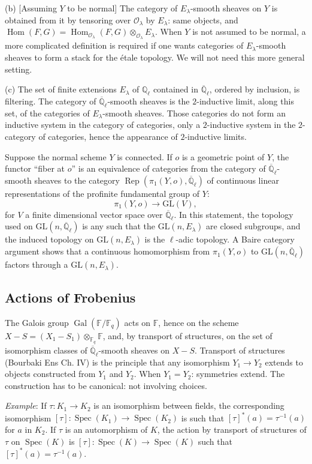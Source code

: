 \documentclass[11pt,a4paper]{article}
\theoremstyle{plain}
\theoremstyle{definition}
\DeclareMathOperator{\Hom}{Hom}
\DeclareMathOperator{\Rep}{Rep}
\DeclareMathOperator{\Spec}{Spec}
\DeclareMathOperator{\Gal}{Gal}
\newcommand{\Ql}{\overline{\mathbb{Q}}_\ell}
\newcommand{\Fq}{\mathbb{F}_q}
\newcommand{\F}{\mathbb{F}}
\newcommand{\Q}{\mathbb{Q}}
\newcommand{\GL}{\mathrm{GL}}
\begin{document}
(b) [Assuming $Y$ to be normal] The category of $E_\lambda$-smooth sheaves on $Y$ is obtained from it by tensoring over $\mathcal{O}_\lambda$ by $E_\lambda$: same objects, and $\Hom(F,G) = \Hom_{\mathcal{O}_\lambda}(F,G) \otimes_{\mathcal{O}_\lambda} E_\lambda$. When $Y$ is not assumed to be normal, a more complicated definition is required if one wants categories of $E_\lambda$-smooth sheaves to form a stack for the \'etale topology. We will not need this more general setting.

(c) The set of finite extensions $E_\lambda$ of $\Q_\ell$ contained in $\Ql$, ordered by inclusion, is filtering. The category of $\Ql$-smooth sheaves is the $2$-inductive limit, along this set, of the categories of $E_\lambda$-smooth sheaves. Those categories do not form an inductive system in the category of categories, only a $2$-inductive system in the $2$-category of categories, hence the appearance of $2$-inductive limits.

Suppose the normal scheme $Y$ is connected. If $o$ is a geometric point of $Y$, the functor ``fiber at $o$'' is an equivalence of categories from the category of $\Ql$-smooth sheaves to the category $\Rep(\pi_1(Y,o), \Ql)$ of continuous linear representations of the profinite fundamental group of $Y$:
\[
\pi_1(Y,o) \to \GL(V),
\]
for $V$ a finite dimensional vector space over $\Ql$. In this statement, the topology used on $\GL(n, \Ql)$ is any such that the $\GL(n, E_\lambda)$ are closed subgroups, and the induced topology on $\GL(n, E_\lambda)$ is the $\ell$-adic topology. A Baire category argument shows that a continuous homomorphism from $\pi_1(Y,o)$ to $\GL(n, \Ql)$ factors through a $\GL(n, E_\lambda)$.

\subsection{Actions of Frobenius}

The Galois group $\Gal(\F/\Fq)$ acts on $\F$, hence on the scheme $X - S = (X_1 - S_1) \otimes_{\Fq} \F$, and, by transport of structures, on the set of isomorphism classes of $\Ql$-smooth sheaves on $X - S$. Transport of structures (Bourbaki Ens Ch. IV) is the principle that any isomorphism $Y_1 \to Y_2$ extends to objects constructed from $Y_1$ and $Y_2$. When $Y_1 = Y_2$: symmetries extend. The construction has to be canonical: not involving choices.

\textit{Example}: If $\tau: K_1 \to K_2$ is an isomorphism between fields, the corresponding isomorphism $[\tau]: \Spec(K_1) \to \Spec(K_2)$ is such that $[\tau]^*(a) = \tau^{-1}(a)$ for $a$ in $K_2$. If $\tau$ is an automorphism of $K$, the action by transport of structures of $\tau$ on $\Spec(K)$ is $[\tau]: \Spec(K) \to \Spec(K)$ such that $[\tau]^*(a) = \tau^{-1}(a)$.
\end{document}
